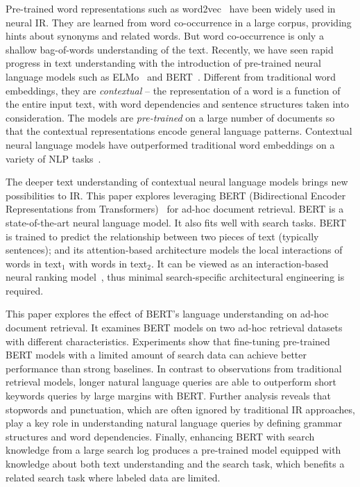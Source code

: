 \documentclass[sigconf]{acmart}
\begin{document}
Pre-trained word representations such as word2vec~\cite{word2vec} have been widely used in neural IR. They are learned from word co-occurrence in a large corpus, providing hints about synonyms and related words. But word co-occurrence is only a shallow bag-of-words understanding of the text.  Recently, we have seen rapid progress in text understanding with the introduction of pre-trained neural language models such as ELMo~\cite{Peters:2018} and BERT~\cite{devlin2018bert}. 
Different from traditional word embeddings, they are \emph{contextual}  -- the representation of a word is a function of the entire input text, with word dependencies and sentence structures taken into consideration. The models are \emph{pre-trained} on a large number of documents so that the contextual representations encode general language patterns. Contextual neural language models have outperformed traditional word embeddings on a variety of NLP tasks~\cite{Peters:2018, devlin2018bert}.



The deeper text understanding of contextual neural language models brings new possibilities to IR. This paper explores leveraging BERT (Bidirectional Encoder Representations from Transformers)~\cite{devlin2018bert} for ad-hoc document retrieval. BERT is a state-of-the-art neural language model. It also fits well with search tasks. 
BERT is trained to predict the relationship between two pieces of text (typically sentences); and its attention-based architecture models the local interactions of words in text$_1$ with words in text$_2$.  It can be viewed as an interaction-based neural ranking model~\cite{DRMM}, thus minimal search-specific architectural engineering is required.  









This paper explores the effect of BERT's language understanding on ad-hoc document retrieval. It examines BERT models on two ad-hoc retrieval datasets with different characteristics.  Experiments show that fine-tuning pre-trained BERT models with a limited amount of search data can achieve better performance than strong baselines. In contrast to observations from traditional retrieval models, longer natural language queries are able to outperform short keywords queries by large margins with BERT. Further analysis reveals that stopwords and punctuation, which are often ignored by traditional IR approaches, play a key role in understanding natural language queries by defining grammar structures and word dependencies. Finally, enhancing BERT with search knowledge from a large search log produces a pre-trained model equipped with knowledge about both text understanding and the search task, which benefits a related search task where labeled data are limited.
\end{document}
